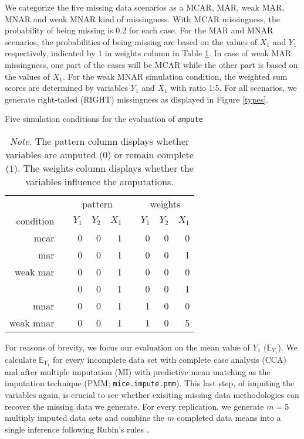 \documentclass[11pt,a4paper]{article}
\newcommand{\code}[1]{\texttt{#1}}
\begin{document}
We categorize the five missing data scenarios as a MCAR, MAR, weak MAR, MNAR and weak MNAR kind of missingness. With MCAR missingness, the probability of being missing is 0.2 for each case. For the MAR and MNAR scenarios, the probabilities of being missing are based on the values of $X_1$ and $Y_1$ respectively, indicated by $1$ in weights column in Table \ref{cond1}. In case of weak MAR missingness, one part of the cases will be MCAR while the other part is based on the values of $X_1$. For the weak MNAR simulation condition, the weighted sum scores are determined by variables $Y_1$ and $X_1$ with ratio 1:5. For all scenarios, we generate right-tailed (RIGHT) missingness as displayed in Figure \ref{types}. 

\begin{table}[b!]
\centering
\captionsetup{justification=justified,singlelinecheck=false,width = 0.50\textwidth}
\caption{\normalsize{Five simulation conditions for the evaluation of \code{ampute}}}
  \label{cond1}
\begin{tabular}{rrrrrrrrr}
  \hline
&& \multicolumn{3}{c}{pattern} && \multicolumn{3}{c}{weights} \\
\cline{3-5} \cline{7-9}
condition & & $Y_1$ & $Y_2$ & $X_1$ & & $Y_1$ & $Y_2$ & $X_1$ \\
\hline 
mcar & & 0 & 0 & 1 && 0 & 0 & 0 \\ [0.2cm]
mar & & 0 & 0 & 1 && 0 & 0 & 1 \\ [0.2cm]
weak mar & & 0 & 0 & 1 && 0 & 0 & 0 \\ 
 & & 0 & 0 & 1 && 0 & 0 & 1 \\[0.2 cm]
mnar & & 0 & 0 & 1 && 1 & 0 & 0 \\ [0.2cm]
weak mnar & & 0 & 0 & 1 && 1 & 0 & 5\\
   \hline
   \end{tabular}
   \vspace{2mm}
   \captionsetup{justification=justified,singlelinecheck=false,width = 0.50\textwidth}
\caption*{\footnotesize{\textit{Note.} The pattern column displays whether variables are amputed ($0$) or remain complete ($1$). The weights column displays whether the variables influence the amputations.}}
\end{table}

For reasons of brevity, we focus our evaluation on the mean value of $Y_1$ ($\mathbb{E}_{Y_1}$). We calculate $\mathbb{E}_{Y_1}$ for every incomplete data set with complete case analysis (CCA) and after multiple imputation (MI) with predictive mean matching as the imputation technique (PMM; \code{mice.impute.pmm}). This last step, of imputing the variables again, is crucial to see whether exisiting missing data methodologies can recover the missing data we generate.
For every replication, we generate $m = 5$ multiply imputed data sets and combine the $m$ completed data means into a single inference following Rubin's rules \citep[][pp. 76, 77]{Rubin1987}.
\end{document}
